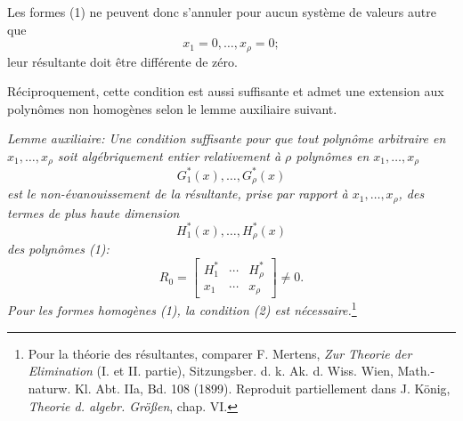 Les formes (1) ne peuvent donc s'annuler pour aucun système de valeurs autre que
\[
  x_1=0,
  \ldots,
  x_\rho=0;
\]
leur résultante doit être différente de zéro.

Réciproquement, cette condition est aussi suffisante et admet une extension aux polynômes non homogènes selon le lemme auxiliaire suivant.

\emph{Lemme auxiliaire: Une condition suffisante pour que tout polynôme arbitraire en $x_1,\ldots,x_\rho$ soit algébriquement entier relativement à $\rho$ polynômes en $x_1,\ldots,x_\rho$}
\[
  G_1^*(x),\ldots,G_\rho^*(x)
\]
\emph{est le non-évanouissement de la résultante, prise par rapport à $x_1,\ldots,x_\rho$, des termes de plus haute dimension}
\[
  H_1^*(x),\ldots,H_\rho^*(x)
\]
\emph{des polynômes (1):}
\begin{equation}
  R_0=\left[
  \begin{array}{ccc}
    H_1^*&\cdots&H_\rho^*\\
    x_1&\cdots&x_\rho
  \end{array}
  \right]\ne0.
\tag{2}
\end{equation}
\emph{Pour les formes homogènes (1), la condition (2) est nécessaire.}\footnote{Pour la théorie des résultantes, comparer F. Mertens, \emph{Zur Theorie der Elimination} (I. et II. partie), Sitzungsber. d. k. Ak. d. Wiss. Wien, Math.-naturw. Kl. Abt. IIa, Bd. 108 (1899). Reproduit partiellement dans J. König, \emph{Theorie d. algebr. Größen}, chap. VI.}

